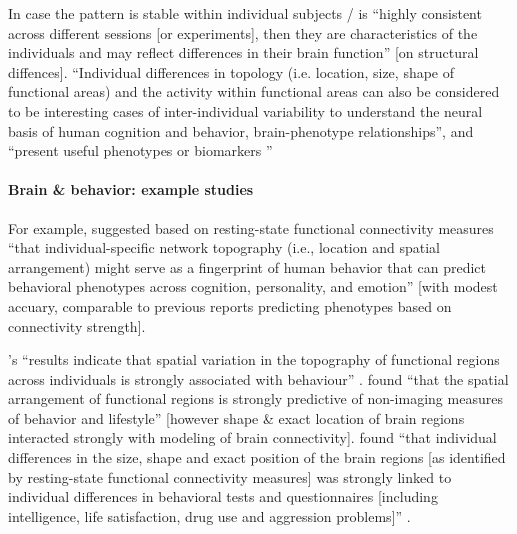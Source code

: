 
In case the pattern is stable within individual subjects / is ``highly
consistent across different sessions [or experiments], then they are
characteristics of the individuals and may reflect differences in their brain
function'' \citep{kanai2011structural} [on structural diffences].
%
``Individual differences in topology (i.e. location, size, shape of functional
areas) and the activity within functional areas can also be considered to be
interesting cases of inter-individual variability to understand the neural basis
of human cognition and behavior, brain-phenotype relationships'', and ``present
useful phenotypes or biomarkers \citep{glasser2016multi,
vanhorn2008individual}''
%

\paragraph{Brain \& behavior: example studies}


%
For example, \citet{kong2019spatial} suggested based on resting-state functional
connectivity measures ``that individual-specific network topography (i.e.,
location and spatial arrangement) might serve as a fingerprint of human behavior
that can predict behavioral phenotypes across cognition, personality, and
emotion'' \citep{kong2019spatial} [with modest accuary, comparable to previous
reports predicting phenotypes based on connectivity strength].

%
\citep{bijsterbosch2018relationship}'s ``results indicate that spatial variation
in the topography of functional regions across individuals is strongly
associated with behaviour'' \citep{bijsterbosch2018relationship}.
%
\citet{bijsterbosch2018relationship} found ``that the spatial arrangement of
functional regions is strongly predictive of non-imaging measures of behavior
and lifestyle'' [however shape \& exact location of brain regions interacted
strongly with  modeling of brain connectivity].
%
\citet{bijsterbosch2018relationship} found ``that individual differences in the
size, shape and exact position of the brain regions [as identified by
resting-state functional connectivity measures] was strongly linked to
individual differences in behavioral tests and questionnaires [including
intelligence, life satisfaction, drug use and aggression problems]''
\citep{bijsterbosch2018relationship}.

